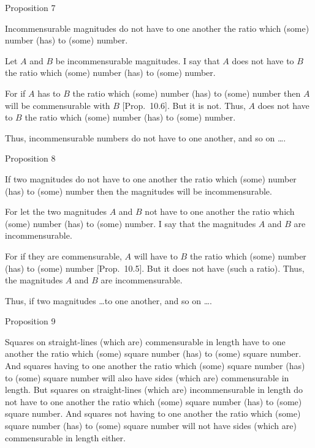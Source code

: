 
\begin{center}
{\large Proposition 7}
\end{center}

Incommensurable magnitudes do not
have to one another the ratio which (some) number (has) to (some)
number.

Let $A$ and $B$ be incommensurable magnitudes. I say that $A$ does not
have to $B$ the ratio which (some) number (has) to (some) number.

\epsfysize=0.5in
\centerline{}

For if $A$ has to $B$ the ratio which (some) number (has) to (some)
number then $A$ will be commensurable with $B$ [Prop.~10.6]. But it is not. Thus, $A$ does not
have to $B$ the ratio which (some) number (has) to (some) number.

Thus, incommensurable numbers do not have to one another, and
so on \ldots.


\begin{center}
{\large Proposition 8}
\end{center}

If two magnitudes do not have to one another the
ratio which (some) number (has) to (some) number then the magnitudes
will be incommensurable.

\epsfysize=0.5in
\centerline{}

For let the two magnitudes $A$ and $B$ not have to one another the ratio
which (some) number (has) to (some) number. I say that the magnitudes
$A$ and $B$ are incommensurable.

For if they are commensurable, $A$ will have to $B$ the ratio which (some)
number (has) to (some) number [Prop.~10.5]. But it does not have (such a ratio).
Thus, the magnitudes $A$ and $B$ are incommensurable.

Thus, if two magnitudes \ldots to one another, and so on \ldots.


\begin{center}
{\large Proposition 9}
\end{center}

Squares on straight-lines (which are) commensurable in length have to one another the ratio which (some) square number (has) to (some)
square number. And squares having to one another the ratio which (some)
square number (has) to (some) square number will also have sides (which are)
commensurable in length. But squares on straight-lines (which are) incommensurable
in length do not have to one another the ratio which (some) square
number (has) to (some) square number. And squares not having
to one another the ratio which (some) square number (has) to (some)
square number will not have sides (which are) commensurable in length either.


